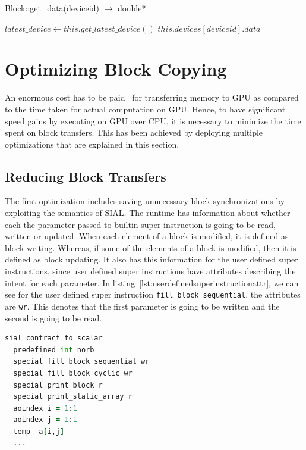 \begin{algorithm}  {Block::get\_data(deviceid) $\rightarrow$ double*}
  \singlespacing

  \begin{algorithmic}[1]
    \State $latest\_device \gets this.get\_latest\_device()$
    \EndIf
    \State \Return $this.devices[deviceid].data$
    \EndFunction
  \end{algorithmic}
  \label{alg:get_data}
\end{algorithm}

\section{Optimizing Block Copying}
An enormous cost has to be paid~\cite{Bakkum2010, memorytransferoverhead}
for transferring memory to GPU as compared to the time taken for actual computation
on GPU. Hence, to have significant speed gains by executing on GPU over CPU,
it is necessary to minimize the time spent on block transfers. This has been
achieved by deploying multiple optimizations that are explained in this section.

\subsection{Reducing Block Transfers}
The first optimization includes saving unnecessary block synchronizations by
exploiting the semantics of SIAL. The runtime has information about whether each
the parameter passed to builtin super instruction is going to be read, written or updated.
When each element of a block is modified, it is defined as block writing. Whereas,
if some of the elements of a block is modified, then it is defined as block updating.
It also has this information for the user defined super instructions, since user
defined super instructions have attributes describing the intent for each parameter.
In listing~\ref{lst:userdefinedsuperinstructionattr}, we can see for the user
defined super instruction \texttt{fill\_block\_sequential}, the attributes are \texttt{wr}.
This denotes that the first parameter is going to be written and the second is going
to be read.

\begin{lstlisting}[caption={SIAL fragment showing user defined super instruction attributes},
  language=Fortran,
  label={lst:userdefinedsuperinstructionattr}]
sial contract_to_scalar
  predefined int norb
  special fill_block_sequential wr
  special fill_block_cyclic wr
  special print_block r
  special print_static_array r
  aoindex i = 1:1
  aoindex j = 1:1
  temp  a[i,j]
  ...
\end{lstlisting}

